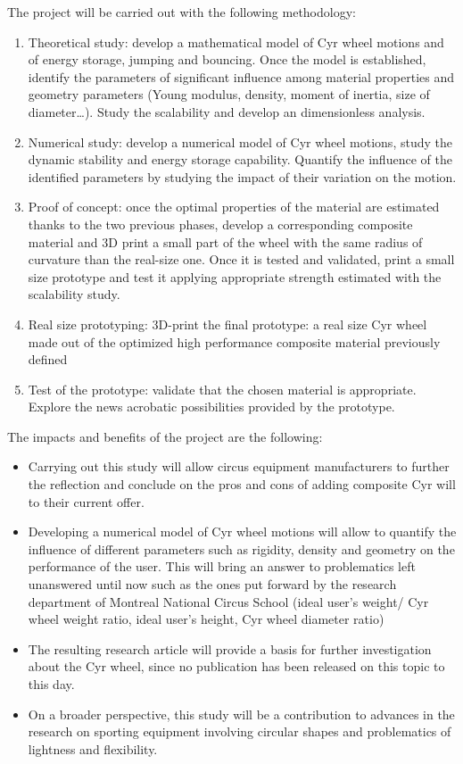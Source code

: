 The project will be carried out with the following methodology:

\begin{enumerate}
\item Theoretical study:
develop a mathematical model of Cyr wheel motions and of energy storage, jumping and bouncing. Once the model is established, identify the parameters of significant influence among material properties and geometry parameters (Young modulus, density, moment of inertia, size of diameter…). Study the scalability and develop an dimensionless analysis.

\item Numerical study:
develop a numerical model of Cyr wheel motions, study the dynamic stability and energy storage capability. Quantify the influence of the identified parameters by studying the impact of their variation on the motion.

\item Proof of concept:
once the optimal properties of the material are estimated thanks to the two previous phases, develop a corresponding composite material and 3D print a small part of the wheel with the same radius of curvature than the real-size one. Once it is tested and validated, print a small size prototype and test it applying appropriate strength estimated with the scalability study.

\item Real size prototyping:
3D-print the final prototype: a real size Cyr wheel made out of the optimized high performance composite material previously defined

\item Test of the prototype:
validate that the chosen material is appropriate.
Explore the news acrobatic possibilities provided by the prototype.

\end{enumerate}


The impacts and benefits of the project are the following:
\begin{itemize}
\item Carrying out this study will allow circus equipment manufacturers to further the reflection and conclude on the pros and cons of adding composite Cyr will to their current offer.
\item Developing a numerical model of Cyr wheel motions will allow to quantify the influence of different parameters such as rigidity, density and geometry on the performance of the user. This will bring an answer to problematics left unanswered until now such as the ones put forward by the research department of Montreal National Circus School (ideal user’s weight/ Cyr wheel weight ratio, ideal user’s height, Cyr wheel diameter ratio) 
\item The resulting research article will provide a basis for further investigation about the Cyr wheel, since no publication has been released on this topic to this day.
\item On a broader perspective, this study will be a contribution to advances in the research on sporting equipment involving circular shapes and problematics of lightness and flexibility.

\end{itemize}
